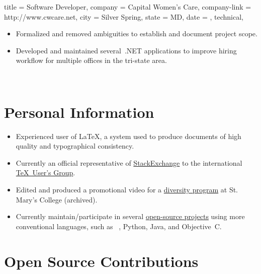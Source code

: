 \documentclass{simplecv}
\newif\ifgithub
\begin{document}
\begin{position}
  {
    title   = Software Developer,
    company = Capital Women's Care,
    company-link = http://www.cwcare.net,
    city    = Silver Spring,
    state   = MD,
    date    = ,
    technical,
  }

\begin{itemize}
\item Formalized and removed ambiguities to establish and document project scope.
\item Developed and maintained several \CSharp\,.NET applications to
  improve hiring workflow for multiple offices in the tri-state area.
\end{itemize}
\end{position}
\vfill \vfill \vfill \vfill %

\newpage
~\vfill
\section{Personal Information}
\begin{itemize}
\item Experienced user of \LaTeX, a system used to produce documents
  of high quality and typographical consistency.
\item Currently an official representative of
  \href{http://meta.tex.stackexchange.com/a/4174/17423}{StackExchange}
  to the international \href{http://www.tug.org}{\TeX\ User's Group}.
\item Edited and produced a promotional video for a \href{http://www.smcm.edu/desousabrent}{diversity program} at St. Mary's College (archived).
\item Currently maintain\slash participate in several
  \href{http://www.github.com/vermiculus}{open-source projects}
  using more conventional languages, such as
  ~\Lisp, Python, Java, and Objective~C.
\end{itemize}

\ifgithub
\vfill\vfill
\section{Open Source Contributions \hfill {}}
\end{document}
